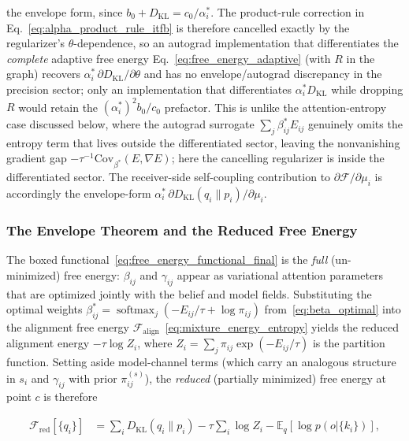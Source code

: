 \documentclass[11pt]{article}
\providecommand{\softmax}{\operatorname{softmax}}
\begin{document}
the envelope form, since $b_0 + D_{\mathrm{KL}} = c_0/\alpha_i^*$. The product-rule correction in Eq.~\eqref{eq:alpha_product_rule_itfb} is therefore cancelled exactly by the regularizer's $\theta$-dependence, so an autograd implementation that differentiates the \emph{complete} adaptive free energy Eq.~\eqref{eq:free_energy_adaptive} (with $R$ in the graph) recovers $\alpha_i^*\,\partial D_{\mathrm{KL}}/\partial\theta$ and has no envelope/autograd discrepancy in the precision sector; only an implementation that differentiates $\alpha_i^* D_{\mathrm{KL}}$ while dropping $R$ would retain the $(\alpha_i^*)^2 b_0/c_0$ prefactor. This is unlike the attention-entropy case discussed below, where the autograd surrogate $\sum_j\beta_{ij}^* E_{ij}$ genuinely omits the entropy term that lives outside the differentiated sector, leaving the nonvanishing gradient gap $-\tau^{-1}\mathrm{Cov}_{\beta^*}(E,\nabla E)$; here the cancelling regularizer is inside the differentiated sector. The receiver-side self-coupling contribution to $\partial\mathcal{F}/\partial\mu_i$ is accordingly the envelope-form $\alpha_i^*\,\partial D_{\mathrm{KL}}(q_i\|p_i)/\partial\mu_i$.

\subsubsection{The Envelope Theorem and the Reduced Free Energy}
\label{sec:envelope_theorem}

The boxed functional~\eqref{eq:free_energy_functional_final} is the \emph{full} (un-minimized) free energy: $\beta_{ij}$ and $\gamma_{ij}$ appear as variational attention parameters that are optimized jointly with the belief and model fields. Substituting the optimal weights $\beta_{ij}^* = \softmax_j(-E_{ij}/\tau + \log\pi_{ij})$ from~\eqref{eq:beta_optimal} into the alignment free energy $\mathcal{F}_{\text{align}}$~\eqref{eq:mixture_energy_entropy} yields the reduced alignment energy $-\tau\log Z_i$, where $Z_i = \sum_j \pi_{ij}\exp(-E_{ij}/\tau)$ is the partition function. Setting aside model-channel terms (which carry an analogous structure in $s_i$ and $\gamma_{ij}$ with prior $\pi^{(s)}_{ij}$), the \emph{reduced} (partially minimized) free energy at point $c$ is therefore

\begin{equation}
\boxed{
\begin{aligned}
\mathcal{F}_{\mathrm{red}}[\{q_i\}]
&=\sum_i D_{\mathrm{KL}}(q_i\|p_i)
-\tau\sum_i \log Z_i
-\mathbb{E}_q[\log p(o|\{k_i\})],
\end{aligned}
}
\label{eq:free_energy_reduced}
\end{equation}
\end{document}
